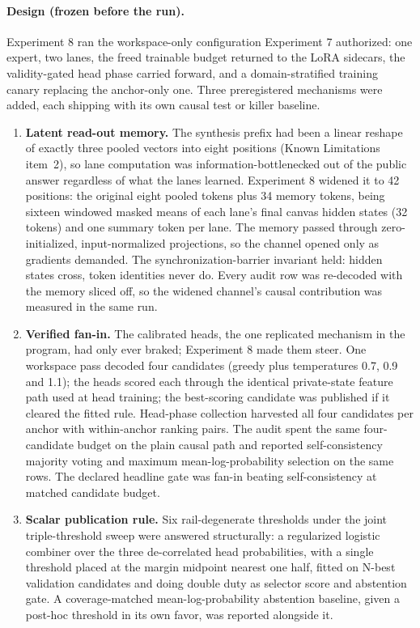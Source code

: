 \documentclass[10pt,a4paper]{article}
\begin{document}
\paragraph{Design (frozen before the run).}
Experiment 8 ran the workspace-only configuration Experiment 7 authorized: one expert,
two lanes, the freed trainable budget returned to the LoRA sidecars, the
validity-gated head phase carried forward, and a domain-stratified training
canary replacing the anchor-only one. Three preregistered mechanisms were
added, each shipping with its own causal test or killer baseline.

\begin{enumerate}[label=\textbf{M\arabic*.},leftmargin=2.6em]
\item \textbf{Latent read-out memory.} The synthesis prefix had been a linear
  reshape of exactly three pooled vectors into eight positions (Known
  Limitations item~2), so lane computation was information-bottlenecked out
  of the public answer regardless of what the lanes learned. Experiment 8 widened
  it to 42 positions: the original eight pooled tokens plus 34 memory tokens,
  being sixteen windowed masked means of each lane's final canvas hidden
  states (32 tokens) and one summary token per lane. The memory passed
  through zero-initialized, input-normalized projections, so the channel
  opened only as gradients demanded. The synchronization-barrier invariant
  held: hidden states cross, token identities never do. Every audit row was
  re-decoded with the memory sliced off, so the widened channel's causal
  contribution was measured in the same run.
\item \textbf{Verified fan-in.} The calibrated heads, the one replicated
  mechanism in the program, had only ever braked; Experiment 8 made them steer.
  One workspace pass decoded four candidates (greedy plus temperatures 0.7,
  0.9 and 1.1); the heads scored each through the identical private-state
  feature path used at head training; the best-scoring candidate was
  published if it cleared the fitted rule. Head-phase collection harvested
  all four candidates per anchor with within-anchor ranking pairs. The audit
  spent the same four-candidate budget on the plain causal path and reported
  self-consistency majority voting and maximum mean-log-probability selection
  on the same rows. The declared headline gate was fan-in beating
  self-consistency at matched candidate budget.
\item \textbf{Scalar publication rule.} Six rail-degenerate thresholds under
  the joint triple-threshold sweep were answered structurally: a regularized
  logistic combiner over the three de-correlated head probabilities, with a
  single threshold placed at the margin midpoint nearest one half, fitted on
  N-best validation candidates and doing double duty as selector score and
  abstention gate. A coverage-matched mean-log-probability abstention
  baseline, given a post-hoc threshold in its own favor, was reported
  alongside it.
\end{enumerate}
\end{document}
